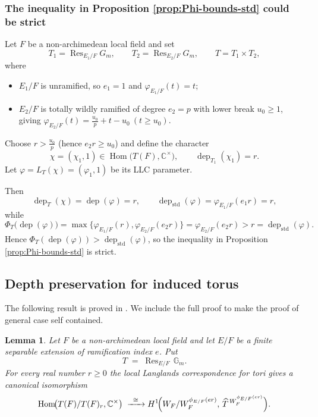 \documentclass[american]{article}
\numberwithin{equation}{section}
\numberwithin{figure}{section}
\theoremstyle{plain}
\newtheorem{lemma}[theorem]{Lemma}
\theoremstyle{definition}
\theoremstyle{remark}
\DeclareMathOperator{\Hom}{Hom}
\DeclareMathOperator{\dep}{dep}
\DeclareMathOperator{\Res}{Res}
\newcommand{\CC}{\mathbb{C}}
\newcommand{\Gm}{\mathbb{G}_m}
\newcommand{\G}{G}
\begin{document}
\subsubsection*{\textbf{The inequality in Proposition \ref{prop:Phi-bounds-std} could be strict}} Let $F$ be a non-archimedean local field and set  
\[
T_1=\Res_{E_1/F}\G_m,\qquad 
T_2=\Res_{E_2/F}\G_m,\qquad 
T=T_1\times T_2,
\]
where  

\smallskip
\begin{itemize}[leftmargin=*]
\item $E_1/F$ is unramified, so $e_1=1$ and $\varphi_{E_1/F}(t)=t$;
\item $E_2/F$ is totally wildly ramified of degree $e_2=p$ with lower break $u_0\ge1$, giving  
      $\displaystyle 
      \varphi_{E_2/F}(t)=
      \frac{u_0}{p}+t-u_0
      \ (t\ge u_0).
      $
\end{itemize}

\smallskip
Choose $r>\tfrac{u_0}{p}$ (hence $e_2r\ge u_0$) and define the character  
\[
\chi=(\chi_1,1)\in\Hom\!\bigl(T(F),\CC^\times\bigr),\qquad
\dep_{T_1}(\chi_1)=r.
\]
Let $\varphi=L_T(\chi)=(\varphi_1,1)$ be its LLC parameter.

\medskip\noindent
Then
\[
\dep_T(\chi)=\dep(\varphi)=r,\qquad
\dep_{\mathrm{std}}(\varphi)=\varphi_{E_1/F}(e_1r)=r,
\]
while
\[
\Phi_T\!\bigl(\dep(\varphi)\bigr)=
\max\!\{\varphi_{E_1/F}(r),\varphi_{E_2/F}(e_2r)\}
=\varphi_{E_2/F}(e_2r)>
r=\dep_{\mathrm{std}}(\varphi).
\]
Hence $\Phi_T(\dep(\varphi))>\dep_{\mathrm{std}}(\varphi)$, so the inequality in Proposition \ref{prop:Phi-bounds-std} is strict.


\subsection{Depth preservation for induced torus}
The following result is proved in \cite[Theorem 6]{MishraPattanayak2015}. We include the full proof to make the proof of general case self contained. 
\begin{lemma}\label{lem:depth-r-simple-induced}
Let \(F\) be a non-archimedean local field and let \(E/F\) be a finite separable
extension of ramification index \(e\).
Put
\[
T \;=\; \Res_{E/F}\,\Gm.
\]
For every real number \(r\ge0\) the local Langlands correspondence for tori
gives a canonical isomorphism
\[
\Hom\!\bigl(T(F)/T(F)_r,\CC^\times\bigr)
\;\xrightarrow{\;\;\cong\;\;}
H^1\!\Bigl(W_F/W_F^{\phi_{E/F}(e r)},\,\widehat{T}^{\,W_F^{\phi_{E/F}(e r)}}\Bigr).
\]
\end{lemma}
\end{document}

